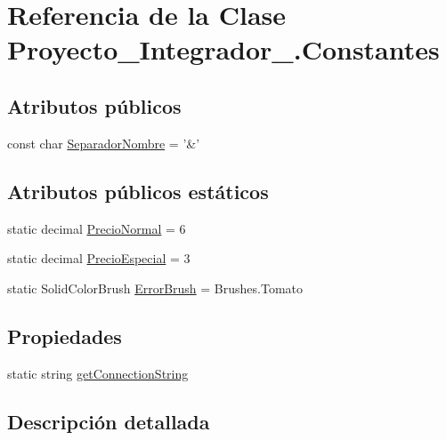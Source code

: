 \hypertarget{class_proyecto___integrador__3_1_1_constantes}{\section{Referencia de la Clase Proyecto\-\_\-\-Integrador\-\_.\-Constantes}
\label{class_proyecto___integrador__3_1_1_constantes}
}
\subsection*{Atributos públicos}
\begin{DoxyCompactItemize}
\item 
const char \hyperlink{class_proyecto___integrador__3_1_1_constantes_a03c73e108b7794395aaa7656837fc36f}{Separador\-Nombre} = '\&'
\end{DoxyCompactItemize}
\subsection*{Atributos públicos estáticos}
\begin{DoxyCompactItemize}
\item 
static decimal \hyperlink{class_proyecto___integrador__3_1_1_constantes_ab04a6b8a156bab28af32fa1ef65c4051}{Precio\-Normal} = 6
\item 
static decimal \hyperlink{class_proyecto___integrador__3_1_1_constantes_a5abb6cd9a7424875b66986ece8453f81}{Precio\-Especial} = 3
\item 
static Solid\-Color\-Brush \hyperlink{class_proyecto___integrador__3_1_1_constantes_a419bedac3e351c570a011551198e9a95}{Error\-Brush} = Brushes.\-Tomato
\end{DoxyCompactItemize}
\subsection*{Propiedades}
\begin{DoxyCompactItemize}
\item 
static string \hyperlink{class_proyecto___integrador__3_1_1_constantes_a7682c1c85a193582716237549c3a84a8}{get\-Connection\-String}
\end{DoxyCompactItemize}


\subsection{Descripción detallada}


